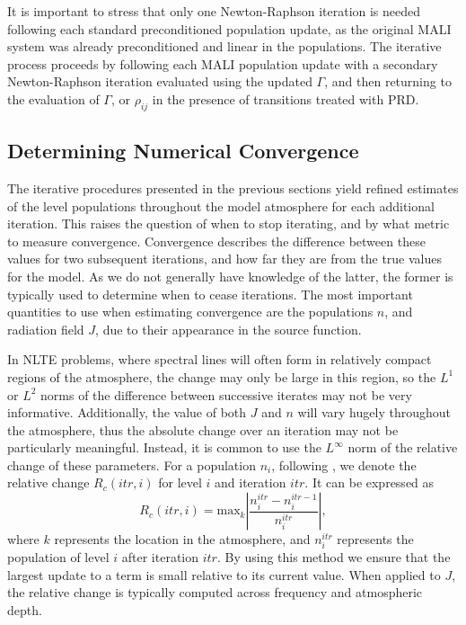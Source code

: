 It is important to stress that only one Newton-Raphson iteration is needed following each standard preconditioned population update, as the original MALI system was already preconditioned and linear in the populations.
The iterative process proceeds by following each MALI population update with a secondary Newton-Raphson iteration evaluated using the updated $\Gamma$, and then returning to the evaluation of $\Gamma$, or $\rho_{ij}$ in the presence of transitions treated with PRD.

\subsection{Determining Numerical Convergence}

The iterative procedures presented in the previous sections yield refined estimates of the level populations throughout the model atmosphere for each additional iteration.
This raises the question of when to stop iterating, and by what metric to measure convergence.
Convergence describes the difference between these values for two subsequent iterations, and how far they are from the true values for the model.
As we do not generally have knowledge of the latter, the former is typically used to determine when to cease iterations.
The most important quantities to use when estimating convergence are the populations $n$, and radiation field $J$, due to their appearance in the source function.

In NLTE problems, where spectral lines will often form in relatively compact regions of the atmosphere, the change may only be large in this region, so the $L^1$ or $L^2$ norms of the difference between successive iterates may not be very informative.
Additionally, the value of both $J$ and $n$ will vary hugely throughout the atmosphere, thus the absolute change over an iteration may not be particularly meaningful.
Instead, it is common to use the $L^\infty$ norm of the relative change of these parameters.
For a population $n_i$, following \citet{Auer1994a}, we denote the relative change $R_c(itr, i)$ for level $i$ and iteration $itr$.
It can be expressed as
\begin{equation}
    R_c(itr, i) = \mathrm{max}_k \left|\frac{n_i^{itr} - n_i^{itr-1}}{n_i^{itr}}\right|,
\end{equation}
where $k$ represents the location in the atmosphere, and $n_i^{itr}$ represents the population of level $i$ after iteration $itr$.
By using this method we ensure that the largest update to a term is small relative to its current value.
When applied to $J$, the relative change is typically computed across frequency and atmospheric depth.

